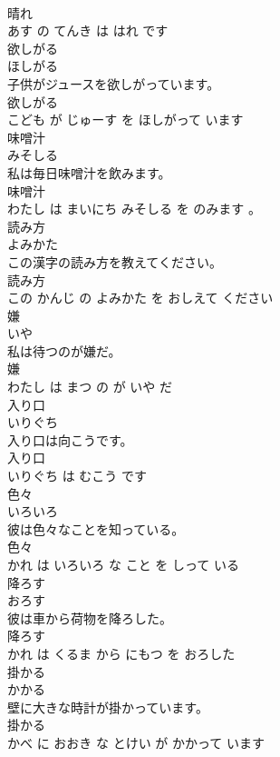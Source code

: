 \documentclass[8pt]{extreport}
\begin{document}
\begin{CJK}{UTF8}{min}
\\	晴れ 
\\	あす の てんき は はれ です			
\\	欲しがる	
\\	ほしがる			
\\	子供がジュースを欲しがっています。	
\\	欲しがる 
\\	こども が じゅーす を ほしがって います			
\\	味噌汁	
\\	みそしる			
\\	私は毎日味噌汁を飲みます。	
\\	味噌汁 
\\	わたし は まいにち みそしる を のみます 。			
\\	読み方	
\\	よみかた			
\\	この漢字の読み方を教えてください。	
\\	読み方 
\\	この かんじ の よみかた を おしえて ください			
\\	嫌	
\\	いや			
\\	私は待つのが嫌だ。	
\\	嫌 
\\	わたし は まつ の が いや だ			
\\	入り口	
\\	いりぐち			
\\	入り口は向こうです。	
\\	入り口 
\\	いりぐち は むこう です			
\\	色々	
\\	いろいろ			
\\	彼は色々なことを知っている。	
\\	色々 
\\	かれ は いろいろ な こと を しって いる			
\\	降ろす	
\\	おろす			
\\	彼は車から荷物を降ろした。	
\\	降ろす 
\\	かれ は くるま から にもつ を おろした			
\\	掛かる	
\\	かかる			
\\	壁に大きな時計が掛かっています。	
\\	掛かる 
\\	かべ に おおき な とけい が かかって います			

\end{CJK}
\end{document}
